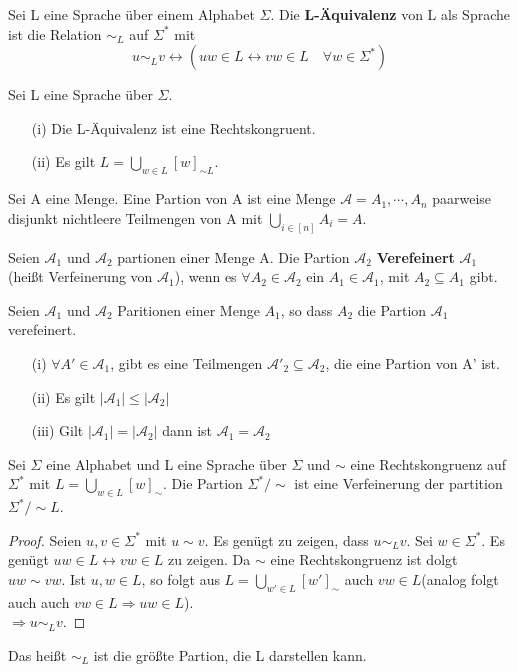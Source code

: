   Sei L eine Sprache über einem Alphabet \(\Sigma\). Die \textbf{L-Äquivalenz} von L als Sprache ist die Relation \(\sim_L\) auf \(\Sigma^*\) mit 
  \[
    u \sim_L v \leftrightarrow (uw \in L \leftrightarrow vw \in L \quad \forall w \in \Sigma^*)
  \] 

  Sei L eine Sprache über \(\Sigma\). 
  \begin{itemize}
    \item [(i)] Die L-Äquivalenz ist eine Rechtskongruent.
    \item [(ii)] Es gilt \(L = \bigcup \limits_{w \in L}[w]_{\sim L}\).
  \end{itemize}

  Sei A eine Menge. Eine Partion von A ist eine Menge \(\mathcal{A} = {A_1, \cdots, A_n}\) paarweise disjunkt nichtleere Teilmengen von A mit \(\bigcup \limits_{i \in [n]} A_i = A\).

  Seien \(\mathcal{A}_1\) und \(\mathcal{A}_2\) partionen einer Menge A. Die Partion \(\mathcal{A}_2\) \textbf{Verefeinert} \(\mathcal{A}_1\) (heißt Verfeinerung von \(\mathcal{A}_1\)), wenn es \(\forall A_2 \in \mathcal{A}_2\) ein \(A_1 \in \mathcal{A}_1\), mit \(A_2 \subseteq A_1\) gibt.

  Seien \(\mathcal{A}_1\) und \(\mathcal{A}_2\) Paritionen einer Menge \(A_1\), so dass \(A_2\) die Partion \(\mathcal{A}_1\) verefeinert.
  \begin{itemize}
    \item [(i)] \(\forall A' \in \mathcal{A}_1\), gibt es eine Teilmengen \(\mathcal{A}'_2 \subseteq \mathcal{A}_2\), die eine Partion von A' ist.
    \item [(ii)] Es gilt \(|\mathcal{A}_1| \leq |\mathcal{A}_2|\)
    \item [(iii)] Gilt \(|\mathcal{A}_1| = |\mathcal{A}_2|\) dann ist \(\mathcal{A}_1 = \mathcal{A}_2\)
  \end{itemize}

  Sei \(\Sigma\) eine Alphabet und L eine Sprache über \(\Sigma\) und \(\sim\) eine Rechtskongruenz auf \(\Sigma^*\) mit \(L = \bigcup \limits_{w \in L} [w]_{\sim}\). Die Partion \(\Sigma^*/\sim\) ist eine Verfeinerung der partition \(\Sigma^*/ \sim L\).
  \begin{proof}
    Seien \(u, v \in \Sigma^*\) mit \(u \sim v\). Es genügt zu zeigen, dass \(u \sim_{L} v\). Sei \(w \in \Sigma^*\). Es genügt \(uw \in L \leftrightarrow vw \in L\) zu zeigen. Da \(\sim\) eine Rechtskongruenz ist dolgt \(uw \sim vw\). Ist \(u, w \in L\), so folgt aus \(L = \bigcup \limits_{w' \in L} [w']_\sim\) auch \(vw \in L\)(analog folgt auch auch \(vw \in L \Rightarrow uw \in L\)).\\ \(\Rightarrow u \sim_L v\).
  \end{proof}
  Das heißt \(\sim_L\) ist die größte Partion, die L darstellen kann.


